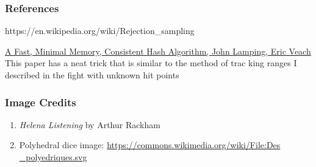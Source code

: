 \documentclass[12pt]{article}
\begin{document}
\hypertarget{references}{%
\subsubsection{References}\label{references}}

https://en.wikipedia.org/wiki/Rejection\_sampling

\href{https://arxiv.org/abs/1406.2294}{{A Fast, Minimal Memory,
Consistent Hash Algorithm, John Lamping, Eric Veach}}\\
This paper has a neat trick that is similar to the method of trac king
ranges I described in the fight with unknown hit points

\hypertarget{image-credits}{%
\subsubsection{Image Credits}\label{image-credits}}

\begin{enumerate}
\def\labelenumi{\arabic{enumi}.}
\item
  \emph{Helena Listening} by Arthur Rackham
\item
  Polyhedral dice image:
  \href{https://commons.wikimedia.org/wiki/File:Des_polyedriques.svg}{{https://commons.wikimedia.org/wiki/File:Des \_polyedriques.svg}}
\end{enumerate}
\fi
\end{document}

